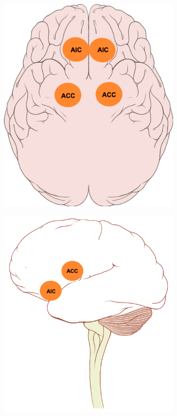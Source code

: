 \documentclass[a4paper, amsfonts, amssymb, amsmath, reprint, showkeys, nofootinbib, twoside]{revtex4-1}
\begin{document}
\begin{figure}[h!]
  \centering
  \begin{subfigure}[b]{0.48\linewidth}
    \includegraphics[width=\linewidth]{images/top-sn.png}
  \end{subfigure}
  \begin{subfigure}[b]{0.48\linewidth}
    \includegraphics[width=\linewidth]{images/side-sn.png}

\end{subfigure}
\end{figure}
\end{document}
